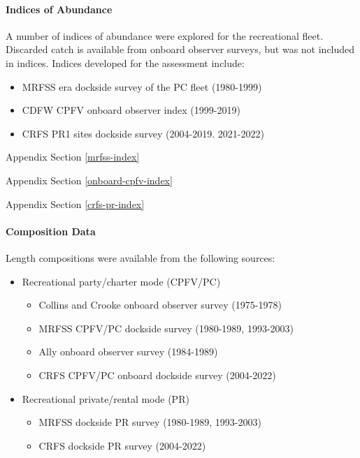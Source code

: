 \documentclass[11pt,
  english,
  letterpaper,
]{article}
\providecommand{\tightlist}{%
  \setlength{\itemsep}{0pt}\setlength{\parskip}{0pt}}
\providecommand{\tightlist}{%
  \setlength{\itemsep}{0pt}\setlength{\parskip}{0pt}}
\begin{document}
\hypertarget{indices-of-abundance}{%
\paragraph{Indices of Abundance}\label{indices-of-abundance}}

\hfill\break

A number of indices of abundance were explored for the recreational fleet. Discarded catch is available from onboard observer surveys, but was not included in indices. Indices developed for the assessment include:

\begin{itemize}
\tightlist
\item
  MRFSS era dockside survey of the PC fleet (1980-1999)
\item
  CDFW CPFV onboard observer index (1999-2019)
\item
  CRFS PR1 sites dockside survey (2004-2019. 2021-2022)
\end{itemize}

Appendix Section \ref{mrfss-index}

Appendix Section \ref{onboard-cpfv-index}

Appendix Section \ref{crfs-pr-index}

\hypertarget{composition-data-1}{%
\paragraph{Composition Data}\label{composition-data-1}}

\hfill\break

Length compositions were available from the following sources:

\begin{itemize}
\item
  Recreational party/charter mode (CPFV/PC)

  \begin{itemize}
  \tightlist
  \item
    Collins and Crooke onboard observer survey (1975-1978)
  \item
    MRFSS CPFV/PC dockside survey (1980-1989, 1993-2003)
  \item
    Ally onboard observer survey (1984-1989)
  \item
    CRFS CPFV/PC onboard dockside survey (2004-2022)
  \end{itemize}
\item
  Recreational private/rental mode (PR)

  \begin{itemize}
  \tightlist
  \item
    MRFSS dockside PR survey (1980-1989, 1993-2003)
  \item
    CRFS dockside PR survey (2004-2022)
  \end{itemize}
\end{itemize}
\end{document}
